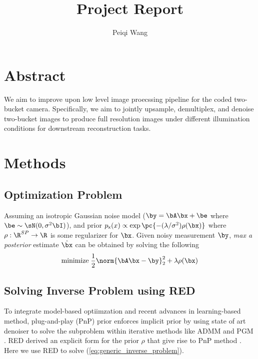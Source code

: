 \documentclass[11pt]{article}
\title{Project Report}
\author{Peiqi Wang}
\newcommand\rx{\ensuremath{\mathsf{x}}}
\begin{document}
\maketitle
\newpage 
\tableofcontents
\newpage


\section{Abstract}
We aim to improve upon low level image proecssing pipeline for the coded two-bucket camera. Specifically, we aim to jointly upsample, demultiplex, and denoise two-bucket images to produce full resolution images under different illumination conditions for downstream reconstruction tasks.





\section{Methods}


\subsection{Optimization Problem}

Assuming an isotropic Gaussian noise model ($\by=\bA\bx + \be$ where $\be\sim \sN(0,\sigma^2 \bI)$), and prior $p_{\rx}(x) \propto \exp\pc{- (\lambda/\sigma^2) \rho(\bx) }$ where $\rho:\R^{SP}\to\R$ is some regularizer for $\bx$. Given noisy measurement $\by$, \textit{max a posterior} estimate $\hat{\bx}$ can be obtained by solving the following
\begin{align}
    \text{minimize}\;
        \frac{1}{2} \norm{\bA\bx-\by}_2^2 + \lambda \rho(\bx)
    \label{eq:generic_inverse_problem}
\end{align}

\subsection{Solving Inverse Problem using RED}

To integrate model-based optiimzation and recent advances in learning-based method, plug-and-play (PnP) prior enforces implicit prior by using state of art denoiser to solve the subproblem within iterative methods like ADMM and PGM \cite{venkatakrishnanPlugandPlayPriorsModel2013}. RED derived an explicit form for the prior $\rho$ that give rise to PnP method \cite{romanoLittleEngineThat2016}. Here we use RED to solve (\ref{eq:generic_inverse_problem}).
\end{document}
